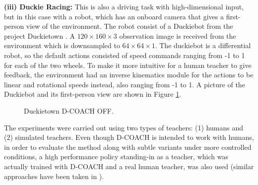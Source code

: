 \textbf{(iii) Duckie Racing:} This is also a driving task with high-dimensional input, but in this case with a robot, which has an onboard camera that gives a first-person view of the environment. The robot consist of a Duckiebot from the project Duckietown \cite{Paull2017}. A $120\times160\times3$ observation image is received from the environment which is downsampled to $64\times64\times1$. The duckiebot is a differential robot, so the default actions consisted of speed commands ranging from -1 to 1 for each of the two wheels. To make it more intuitive for a human teacher to give feedback, the environment had an inverse kinematics module for the actions to be linear and rotational speeds instead, also ranging from -1 to 1. A picture of the Duckiebot and its first-person view are shown in Figure \ref{fig:duckietown_off}.

\begin{figure}[h]
\centering
{} 
\hspace{1.3cm}
\caption{Duckietown D-COACH OFF.} 
\label{fig:duckietown_off} 
\end{figure}

The experiments were carried out using two types of teachers: (1) humans and (2) simulated teachers. Even though D-COACH is intended to work with humans, in order to evaluate the method along with subtle variants under more controlled conditions, a high performance policy standing-in as a teacher, which was actually trained with D-COACH and a real human teacher, was also used (similar approaches have been taken in \cite{Celemin2018AnInteractive, griffith2013policy}).

